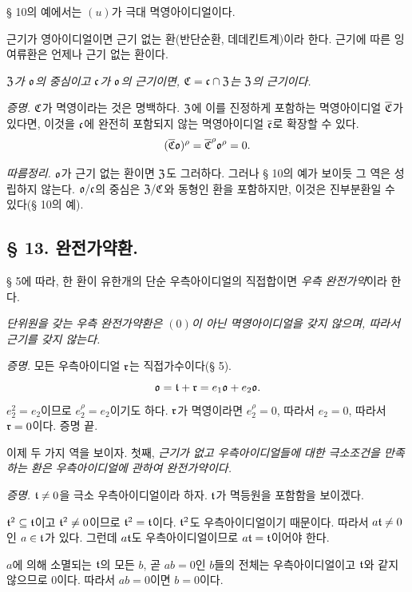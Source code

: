 § 10의 예에서는 \((u)\)가 극대 멱영아이디얼이다.

근기가 영아이디얼이면 \glqq{}근기 없는 환\grqq{}(\glqq{}반단순환\grqq{}, \glqq{}데데킨트계\grqq{})이라 한다. 근기에 따른 잉여류환은 언제나 근기 없는 환이다.

\emph{\(\mathfrak Z\)가 \(\mathfrak o\)의 중심이고 \(\mathfrak c\)가 \(\mathfrak o\)의 근기이면, \(\mathfrak{C}=\mathfrak c\cap\mathfrak Z\)는 \(\mathfrak Z\)의 근기이다.}

\emph{증명.} \(\mathfrak{C}\)가 멱영이라는 것은 명백하다. \(\mathfrak Z\)에 이를 진정하게 포함하는 멱영아이디얼 \(\overline{\mathfrak{C}}\)가 있다면, 이것을 \(\mathfrak c\)에 완전히 포함되지 않는 멱영아이디얼 \(\overline{\mathfrak c}\)로 확장할 수 있다.
\[
        (\overline{\mathfrak{C}}\mathfrak o)^\rho
        =\overline{\mathfrak{C}}^{\rho}\mathfrak o^\rho=0.
\]

\emph{따름정리.} \(\mathfrak o\)가 근기 없는 환이면 \(\mathfrak Z\)도 그러하다. 그러나 § 10의 예가 보이듯 그 역은 성립하지 않는다. \(\mathfrak o/\mathfrak c\)의 중심은 \(\mathfrak Z/\mathfrak{C}\)와 동형인 환을 포함하지만, 이것은 진부분환일 수 있다(§ 10의 예).

\subsection*{§ 13. 완전가약환.}

§ 5에 따라, 한 환이 유한개의 단순 우측아이디얼의 직접합이면 \emph{우측 완전가약}이라 한다.

\emph{단위원을 갖는 우측 완전가약환은 \((0)\)이 아닌 멱영아이디얼을 갖지 않으며, 따라서 근기를 갖지 않는다.}

\emph{증명.} 모든 우측아이디얼 \(\mathfrak r\)는 직접가수이다(§ 5).
\[
        \mathfrak o=\mathfrak{t}+\mathfrak r=e_1\mathfrak o+e_2\mathfrak o.
\]
\(e_2^2=e_2\)이므로 \(e_2^\rho=e_2\)이기도 하다. \(\mathfrak r\)가 멱영이라면 \(e_2^\rho=0\), 따라서 \(e_2=0\), 따라서 \(\mathfrak r=0\)이다. 증명 끝.

이제 두 가지 역을 보이자. 첫째, \emph{근기가 없고 우측아이디얼들에 대한 극소조건을 만족하는 환은 우측아이디얼에 관하여 완전가약이다.}

\emph{증명.} \(\mathfrak{t}\ne0\)을 극소 우측아이디얼이라 하자. \(\mathfrak{t}\)가 멱등원을 포함함을 보이겠다.

\(\mathfrak{t}^2\subseteq\mathfrak{t}\)이고 \(\mathfrak{t}^2\ne0\)이므로 \(\mathfrak{t}^2=\mathfrak{t}\)이다. \(\mathfrak{t}^2\)도 우측아이디얼이기 때문이다. 따라서 \(a\mathfrak{t}\ne0\)인 \(a\in\mathfrak{t}\)가 있다. 그런데 \(a\mathfrak{t}\)도 우측아이디얼이므로 \(a\mathfrak{t}=\mathfrak{t}\)이어야 한다.

\(a\)에 의해 소멸되는 \(\mathfrak{t}\)의 모든 \(b\), 곧 \(ab=0\)인 \(b\)들의 전체는 우측아이디얼이고 \(\mathfrak{t}\)와 같지 않으므로 0이다. 따라서 \(ab=0\)이면 \(b=0\)이다.

